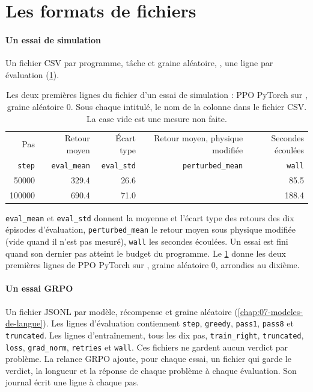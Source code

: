 \section{Les formats de fichiers}
\label{sec:formats}

\paragraph{Un essai de simulation} Un fichier CSV par programme, tâche et graine aléatoire,
, une ligne par évaluation (\cref{tab:format-essai}).
\begin{table}[htbp]
\centering
\small
\caption{Les deux premières lignes du fichier d'un essai de simulation : PPO PyTorch sur , graine aléatoire 0. Sous chaque intitulé, le nom de la colonne dans le fichier CSV. La case vide est une mesure non faite.}
\label{tab:format-essai}
\begin{tabular}{@{}rrrrr@{}}
\toprule
Pas & Retour moyen & Écart type & Retour moyen, physique modifiée & Secondes écoulées \\
{\footnotesize\texttt{step}} & {\footnotesize\texttt{eval\_mean}} & {\footnotesize\texttt{eval\_std}} & {\footnotesize\texttt{perturbed\_mean}} & {\footnotesize\texttt{wall}} \\
\midrule
\num{50000} & \num{329.4} & \num{26.6} & & \num{85.5} \\
\num{100000} & \num{690.4} & \num{71.0} & & \num{188.4} \\
\bottomrule
\end{tabular}
\end{table}
\texttt{eval\_mean} et \texttt{eval\_std} donnent la moyenne et l'écart type des retours des dix
épisodes d'évaluation, \texttt{perturbed\_mean} le retour moyen sous physique modifiée (vide quand il
n'est pas mesuré), \texttt{wall} les secondes écoulées. Un essai est fini quand son dernier pas
atteint le budget du programme. Le \cref{tab:format-essai} donne les deux premières lignes de PPO
PyTorch sur , graine aléatoire 0, arrondies au dixième.

\paragraph{Un essai GRPO} Un fichier JSONL par modèle, récompense et graine aléatoire
(\cref{chap:07-modeles-de-langue}). Les lignes d'évaluation contiennent \texttt{step},
\texttt{greedy}, \texttt{pass1}, \texttt{pass8} et \texttt{truncated}. Les lignes d'entraînement,
tous les dix pas, \texttt{train\_right}, \texttt{truncated}, \texttt{loss}, \texttt{grad\_norm},
\texttt{retries} et \texttt{wall}. Ces fichiers ne gardent aucun verdict par problème. La relance
GRPO ajoute, pour chaque essai, un fichier  qui garde le verdict, la
longueur et la réponse de chaque problème à chaque évaluation. Son journal écrit une ligne à chaque pas.

